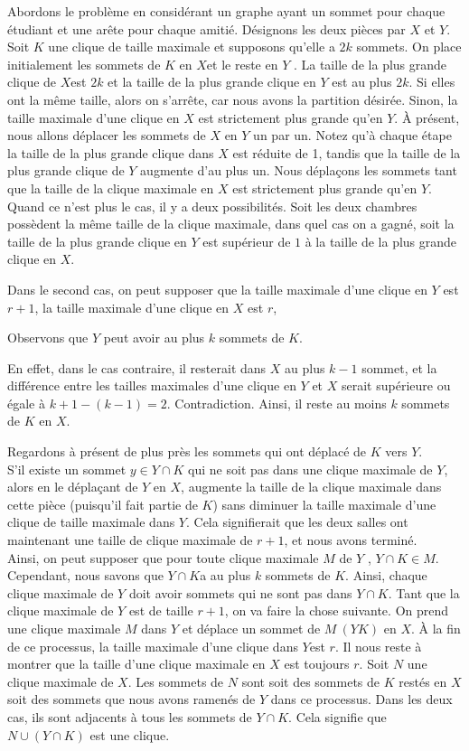 \begin{sol}
Abordons le problème en considérant un graphe ayant un sommet pour chaque étudiant et une arête pour chaque amitié. Désignons les deux pièces par $X$ et $Y$. Soit $K$ une clique de taille maximale et supposons qu'elle a $2k$ sommets. On place initialement les sommets de $K$ en $ X$et le reste en $Y$ . La taille de la plus grande clique de $X $est $2k$ et la taille de la plus grande clique en $Y$ est au plus $2k$. Si elles ont la même taille, alors on s’arrête, car nous avons la partition désirée. Sinon, la taille maximale d’une clique en $X$ est strictement plus grande qu’en $Y$. À présent, nous allons déplacer les sommets de $X$ en $Y$ un par un. Notez qu'à chaque étape la taille de la plus grande clique dans $X $ est réduite de 1, tandis que la taille de la plus grande clique de $Y$ augmente d'au plus un. Nous déplaçons les sommets tant que la taille de la clique maximale en $X$ est strictement plus grande qu’en $Y $. Quand ce n'est plus le cas, il y a deux possibilités. Soit les deux chambres possèdent la même taille de la clique maximale, dans quel cas on a gagné, soit la taille de la plus grande clique en $Y$ est supérieur de $1$ à la taille de la plus grande clique en $X$.

Dans le second cas, on peut supposer que la taille maximale d’une clique en $Y$ est $r + 1$, la taille maximale d’une clique en $X$ est $r $,

Observons que $Y$ peut avoir au plus $k$ sommets de $K$.

En effet, dans le cas contraire, il resterait dans $X$ au plus $k-1$ sommet, et la différence entre les tailles maximales d’une clique en $Y$ et $X$ serait supérieure ou égale à $k+1-(k-1)=2$. Contradiction. Ainsi, il reste au moins $k$ sommets de $K$ en $X$.

Regardons à présent de plus près les sommets qui ont déplacé de $K$ vers $Y$. \\
S'il existe un sommet $y \in Y \cap K$ qui ne soit pas dans une clique maximale de $Y$, alors en le déplaçant de $ Y$ en $X$, augmente la taille de la clique maximale dans cette pièce (puisqu'il fait partie de $K$) sans diminuer la taille maximale d'une clique de taille maximale dans $Y $. Cela signifierait que les deux salles ont maintenant une taille de clique maximale de $r + 1$, et nous avons terminé. \\
Ainsi, on peut supposer que pour toute clique maximale $M$ de $Y$ , $Y \cap K \in M$. Cependant, nous savons que
$Y \cap K $a au plus $ k$ sommets de $K$. Ainsi, chaque clique maximale de $Y$ doit avoir sommets qui ne sont pas dans $Y \cap K$. Tant que la clique maximale de $Y$ est de taille $r+1$, on va faire la chose suivante. On prend une clique maximale $M$ dans $Y$ et déplace un sommet de $M\ (Y K)$ en $X$. À la fin de ce processus, la taille maximale d'une clique dans $Y $est $r$. Il nous reste à montrer que la taille d’une clique maximale en $X$ est toujours $r$. Soit $N $ une clique maximale de $X$. Les sommets de $N$ sont soit des sommets de $K$ restés en
$X$ soit des sommets que nous avons ramenés de $Y$ dans ce processus. Dans les deux cas, ils sont adjacents à tous les sommets de $Y \cap K.$ Cela signifie que $N \cup (Y \cap K) $ est une clique.


\end{sol}

